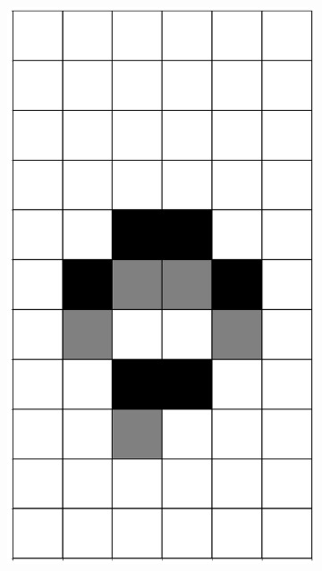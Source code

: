 \documentclass[12pt]{article}
\numberwithin{figure}{section} %
\begin{document}
\begin{figure}[H]
\begin{subfigure}{0.19\textwidth}
     \centering
     \includegraphics[width=\linewidth]{Section4/2.1}
   \end{subfigure}
        \begin{subfigure}{0.19\textwidth}
     \centering

\end{subfigure}
\end{figure}
\end{document}
